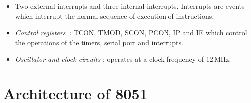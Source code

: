 \begin{itemize}
\item Two external interrupts and three internal interrupts. Interrupts are events which interrupt the normal sequence of execution of instructions.

\item {\em Control registers~:} TCON, TMOD, SCON, PCON, IP and IE which control the operations of the timers, serial port and interrupts.

\item {\em Oscillator and clock circuits} : operates at a clock frequency of 12\,MHz.
\end{itemize}

\section{Architecture of 8051}\label{sec7.14}

